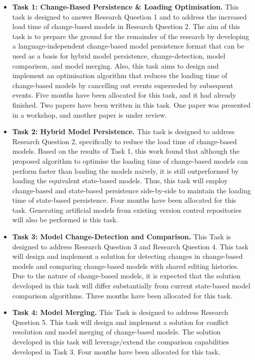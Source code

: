 \documentclass[12pt, a4paper]{report} \usepackage[titletoc]{appendix}
\begin{document}
\begin{itemize}
    \item \textbf{Task 1: Change-Based Persistence \& Loading Optimisation.} This task is designed to answer Research Question 1 and to address the increased load time of change-based models in Research Question 2. The aim of this task is to prepare the ground for the remainder of the research by developing a language-independent change-based model persistence format that can be used as a basis for hybrid model persistence, change-detection, model comparison, and model merging. Also, this task aims to design and implement an optimisation algorithm that reduces the loading time of change-based models by cancelling out events superseded by subsequent events. Five months have been allocated for this task, and it had already finished. Two papers have been written in this task. One paper was presented in a workshop, and another paper is under review. 
    \item \textbf{Task 2: Hybrid Model Persistence.} This task is designed to address Research Question 2, specifically to reduce the load time of change-based models.  Based on the results of Task 1, this work found that although the proposed algorithm to optimise the loading time of change-based models can perform faster than loading the models naively, it is still outperformed by loading the equivalent state-based models. Thus, this task will employ change-based and state-based persistence side-by-side to maintain the loading time of state-based persistence. Four months have been allocated for this task. Generating artificial models from existing version control repositories will also be performed is this task.  
    \item \textbf{Task 3: Model Change-Detection and Comparison.} This Task is designed to address Research Question 3 and Research Question 4. This task will design and implement a solution for detecting changes in change-based models and comparing change-based models with shared editing histories. Due to the nature of change-based models, it is expected that the solution developed in this task will differ substantially from current state-based model comparison algorithms. Three months have been allocated for this task.  
    \item \textbf{Task 4: Model Merging.} This Task is designed to address Research Question 5. This task will design and implement a solution for conflict resolution and model merging of change-based models. The solution developed in this task will leverage/extend the comparison capabilities developed in Task 3. Four months have been allocated for this task. 

\end{itemize}
\end{document}
